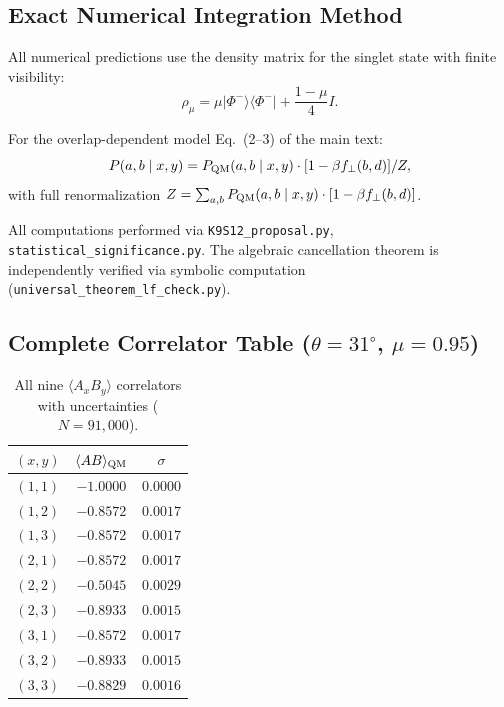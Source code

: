 \documentclass[12pt]{article}
\begin{document}
\subsection{Exact Numerical Integration Method}

All numerical predictions use the density matrix for the singlet state with finite visibility:
\begin{equation}
\rho_\mu = \mu|\Phi^-\rangle\langle\Phi^-| + \frac{1-\mu}{4}I.
\end{equation}

For the overlap-dependent model Eq.~(2--3) of the main text:
\begin{equation}
P(a,b \mid x,y) = P_{\rm QM}(a,b \mid x,y) \cdot [1 - \beta f_\perp(b,d)] / Z,
\end{equation}
with full renormalization $Z = \sum_{a,b} P_{\rm QM}(a,b \mid x,y) \cdot [1 - \beta f_\perp(b,d)]$.

All computations performed via \texttt{K9S12\_proposal.py}, \texttt{statistical\_significance.py}. The algebraic cancellation theorem is independently verified via symbolic computation (\texttt{universal\_theorem\_lf\_check.py}).

\subsection{Complete Correlator Table ($\theta = 31^\circ$, $\mu = 0.95$)}

\begin{table}[h]
\centering
\caption{All nine $\langle A_x B_y\rangle$ correlators with uncertainties ($N = 91{,}000$).}
\begin{tabular}{ccc}
\toprule
$(x,y)$ & $\langle AB\rangle_{\rm QM}$ & $\sigma$ \\
\midrule
$(1,1)$ & $-1.0000$ & $0.0000$ \\
$(1,2)$ & $-0.8572$ & $0.0017$ \\
$(1,3)$ & $-0.8572$ & $0.0017$ \\
$(2,1)$ & $-0.8572$ & $0.0017$ \\
$(2,2)$ & $-0.5045$ & $0.0029$ \\
$(2,3)$ & $-0.8933$ & $0.0015$ \\
$(3,1)$ & $-0.8572$ & $0.0017$ \\
$(3,2)$ & $-0.8933$ & $0.0015$ \\
$(3,3)$ & $-0.8829$ & $0.0016$ \\
\bottomrule
\end{tabular}
\end{table}
\end{document}
